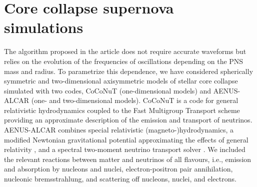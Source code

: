 \section{Core collapse supernova simulations}
\label{sec:simulations}



The algorithm proposed in the article does not require accurate
waveforms but relies on the evolution of the frequencies of
oscillations depending on the PNS mass and radius.  To parametrize
this dependence, we have considered spherically symmetric
\citep{Torres:2019a} and two-dimensional axisymmetric models of
stellar core collapse simulated with two codes, CoCoNuT
(one-dimensional models) and AENUS-ALCAR
\citep{Just_et_al__2015__mnras__Anewmultidimensionalenergy-dependenttwo-momenttransportcodeforneutrino-hydrodynamics}
(one- and two-dimensional models).  CoCoNuT
\citep{Cerda-Duran__2008__AA__GRMHD-code} is a code for general
relativistic hydrodynamics coupled to the Fast Multigroup Transport
scheme \citep{Mueller_Janka_2015_FMT} providing an approximate
description of the emission and transport of neutrinos.  AENUS-ALCAR
\citep{Just_et_al__2015__mnras__Anewmultidimensionalenergy-dependenttwo-momenttransportcodeforneutrino-hydrodynamics}
combines special relativistic (magneto-)hydrodynamics, a modified
Newtonian gravitational potential approximating the effects of general
relativity \citep{Marek_etal__2006__AA__TOV-potential}, and a spectral
two-moment neutrino transport solver
\citep{Just_et_al__2015__mnras__Anewmultidimensionalenergy-dependenttwo-momenttransportcodeforneutrino-hydrodynamics}.
We included the relevant reactions between matter and neutrinos of all
flavours, i.e., emission and absorption by nucleons and nuclei,
electron-positron pair annihilation, nucleonic bremsstrahlung, and
scattering off nucleons, nuclei, and electrons.

